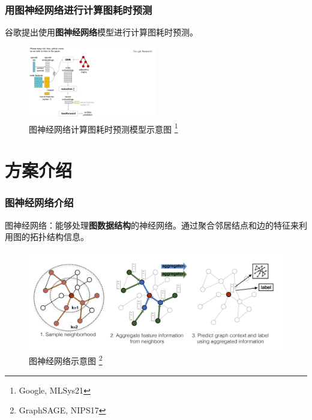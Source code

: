 \documentclass[notes=beamer]{ctexbeamer}
\begin{document}
\begin{frame}[b]
  \frametitle{用图神经网络进行计算图耗时预测}
  谷歌提出使用\textbf{图神经网络}模型进行计算图耗时预测。
  \begin{figure}[t]
    \centering
    \includegraphics[width=0.5\textwidth,trim={0cm .42cm 12cm 1.2cm},clip]{figures/model3.pdf}
    \caption{图神经网络计算图耗时预测模型示意图 \footnote[1]{Google, MLSys21}}
  \label{fig:overview}
  \end{figure}
\end{frame}

\section{方案介绍}

\begin{frame}[b]
  \frametitle{图神经网络介绍}
  图神经网络：能够处理\textbf{图数据结构}的神经网络。通过聚合邻居结点和边的特征来利用图的拓扑结构信息。
  \begin{figure}[h]
    \centering
    \includegraphics[width=1\textwidth]{figures/GNN.png}
    \caption{图神经网络示意图 \footnote[1]{GraphSAGE, NIPS17}}
  \end{figure}
\end{frame}
\end{document}
